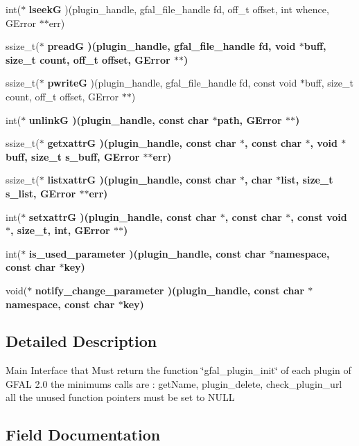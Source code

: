 \begin{CompactItemize}
\item 
int($\ast$ \textbf{lseek\-G} )(plugin\_\-handle, gfal\_\-file\_\-handle fd, off\_\-t offset, int whence, GError $\ast$$\ast$err)\label{struct__gfal__plugin__interface_424d4d77e29e5e4cfe92eae0d6a8bdc2}

\item 
ssize\_\-t($\ast$ \bf{pread\-G} )(plugin\_\-handle, gfal\_\-file\_\-handle fd, void $\ast$buff, size\_\-t count, off\_\-t offset, GError $\ast$$\ast$)
\item 
ssize\_\-t($\ast$ \textbf{pwrite\-G} )(plugin\_\-handle, gfal\_\-file\_\-handle fd, const void $\ast$buff, size\_\-t count, off\_\-t offset, GError $\ast$$\ast$)\label{struct__gfal__plugin__interface_6de31ed116e6223b75fd068a1bd66779}

\item 
int($\ast$ \bf{unlink\-G} )(plugin\_\-handle, const char $\ast$path, GError $\ast$$\ast$)
\item 
ssize\_\-t($\ast$ \bf{getxattr\-G} )(plugin\_\-handle, const char $\ast$, const char $\ast$, void $\ast$buff, size\_\-t s\_\-buff, GError $\ast$$\ast$err)
\item 
ssize\_\-t($\ast$ \bf{listxattr\-G} )(plugin\_\-handle, const char $\ast$, char $\ast$list, size\_\-t s\_\-list, GError $\ast$$\ast$err)
\item 
int($\ast$ \bf{setxattr\-G} )(plugin\_\-handle, const char $\ast$, const char $\ast$, const void $\ast$, size\_\-t, int, GError $\ast$$\ast$)
\item 
int($\ast$ \bf{is\_\-used\_\-parameter} )(plugin\_\-handle, const char $\ast$namespace, const char $\ast$key)
\item 
void($\ast$ \bf{notify\_\-change\_\-parameter} )(plugin\_\-handle, const char $\ast$namespace, const char $\ast$key)
\end{CompactItemize}


\subsection{Detailed Description}
Main Interface that Must return the function \char`\"{}gfal\_\-plugin\_\-init\char`\"{} of each plugin of GFAL 2.0 the minimums calls are : get\-Name, plugin\_\-delete, check\_\-plugin\_\-url all the unused function pointers must be set to NULL 



\subsection{Field Documentation}
